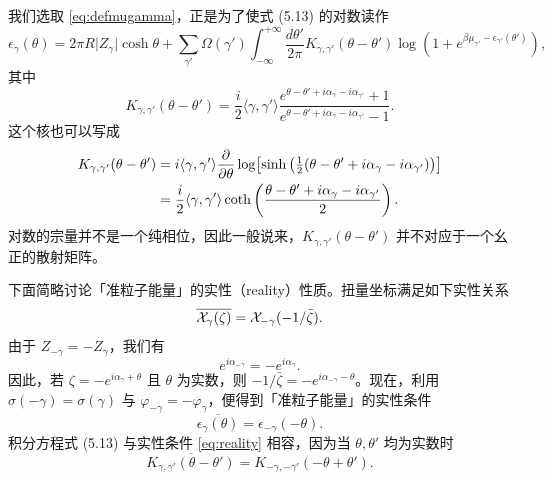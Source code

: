 我们选取 \eqref{eq:defmugamma}，正是为了使式 (5.13) 的对数读作%
%
\begin{equation}\label{eq:GMN-2}
\epsilon_{\gamma}(\theta) = 2\pi R \vert Z_\gamma \vert \cosh\theta
+ \sum_{\gamma'} \Omega(\gamma') \int_{-\infty}^{+\infty}
\frac{d\theta'}{2\pi} K_{\gamma,\gamma'}(\theta-\theta') \log( 1 +
e^{\beta \mu_{\gamma'} - \epsilon_{\gamma'}(\theta')} ),
\end{equation}
%
其中
%
\begin{equation}
K_{\gamma,\gamma'}(\theta-\theta') = \frac{i}{2} \langle \gamma,
\gamma'\rangle \frac{ e^{ \theta - \theta' + i \alpha_{\gamma} - i
\alpha_{\gamma'}} +1 }{e^{ \theta - \theta' + i \alpha_{\gamma} - i
\alpha_{\gamma'}} -1 }.
\end{equation}
%
这个核也可以写成
%
\begin{equation}
\begin{aligned}
K_{\gamma,\gamma'}(\theta-\theta') & = i \langle \gamma, \gamma'
\rangle \frac{\partial}{\partial \theta} \log \bigl[\sinh\left(\tfrac{1}{2} (\theta -
\theta' + i \alpha_{\gamma} - i \alpha_{\gamma'})\right)\bigr]\\
& =\frac{i}{2}\langle \gamma, \gamma' \rangle  \coth\left( \frac{
\theta-\theta' + i \alpha_{\gamma} - i \alpha_{\gamma'}}{2} \right).
\end{aligned}
\end{equation}
%
对数的宗量并不是一个纯相位，因此一般说来，$K_{\gamma,\gamma'}(\theta-\theta')$ 并不对应于一个幺正的散射矩阵。

下面简略讨论「准粒子能量」的实性（reality）性质。扭量坐标满足如下实性关系
%
\begin{equation}
\overline{\mathcal{X}_{\gamma}(\zeta)} = \mathcal{X}_{-\gamma}(-1/\bar \zeta).
\end{equation}
%
由于 $Z_{-\gamma} = - Z_\gamma$，我们有
%
\begin{equation}
e^{i \alpha_{-\gamma}} = - e^{i \alpha_\gamma}.
\end{equation}
%
因此，若 $\zeta = - e^{i \alpha_{\gamma} + \theta}$ 且 $\theta$ 为实数，则 $-1/\bar \zeta = - e^{i \alpha_{-\gamma} - \theta}$。现在，利用 $\sigma(-\gamma) = \sigma(\gamma)$ 与 $\varphi_{-\gamma} = -
\varphi_{\gamma}$，便得到「准粒子能量」的实性条件
%
\begin{equation}\label{eq:reality}
\overline{\epsilon_{\gamma}(\theta)} = \epsilon_{-\gamma}(-\theta).
\end{equation}
%
积分方程式 (5.13) 与实性条件 \eqref{eq:reality} 相容，因为当 $\theta, \theta'$ 均为实数时%
%
\begin{equation}
\overline{K_{\gamma, \gamma'}(\theta-\theta')} = K_{- \gamma, -
\gamma'}(-\theta + \theta').
\end{equation}

